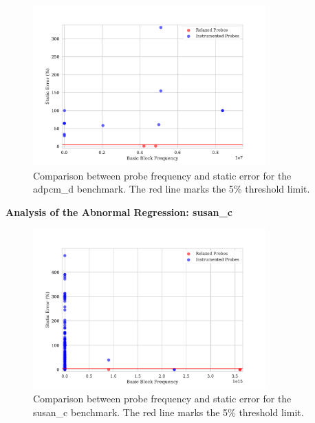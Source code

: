 \begin{figure}[htb]
    \centering
    \includegraphics[width=0.8\textwidth]{figs/adpcm_d.pdf}
    \caption{Comparison between probe frequency and static error for the {\flagstype adpcm\_d} benchmark. The red line marks the 5\% threshold limit.}
    \label{fig:adpcm_d-probes-err-freq}
\end{figure}


\noindent \textbf{Analysis of the Abnormal Regression: {\flagstype susan\_c}}

\begin{figure}[htb]
    \centering
    \includegraphics[width=0.8\textwidth]{figs/susan_c.pdf}
    \caption{Comparison between probe frequency and static error for the {\flagstype susan\_c} benchmark. The red line marks the 5\% threshold limit.}
    \label{fig:speedups}
\end{figure}




